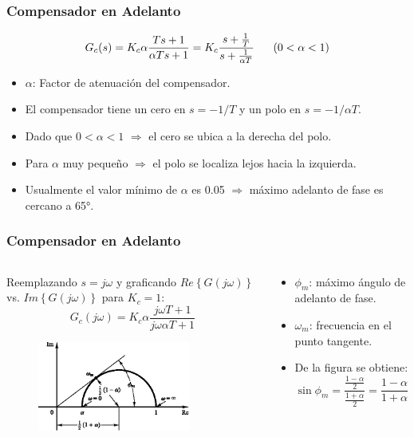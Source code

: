 \documentclass[aspectratio=169, handout]{beamer}
\theoremstyle{definition}
\theoremstyle{plain}
\theoremstyle{remark}
\begin{document}
\begin{frame}[<+->]\frametitle{Compensador en Adelanto}
	\begin{equation*}
		G_c(s) = K_c \alpha \frac{T s + 1}{\alpha T s + 1} = K_c \frac{s+\frac{1}{T}}{s + \frac{1}{\alpha T}}\hspace*{6mm} (0 < \alpha < 1)
	\end{equation*}
	\pause
	\begin{itemize}
		\item $\alpha$: Factor de atenuación del compensador.
		\item El compensador tiene un cero en $s = -1/T$ y un polo en $s = -1/\alpha T$.
		\item Dado que $0 < \alpha < 1$ $\Rightarrow$ el cero se ubica a la derecha del polo.
		\item Para $\alpha$ muy pequeño $\Rightarrow$ el polo se localiza lejos hacia la izquierda.
		\item Usualmente el valor mínimo de $\alpha$ es 0.05 $\Rightarrow$ máximo adelanto de fase es cercano a \ang{65}. 
	\end{itemize}
\end{frame}

\begin{frame}[<+->]\frametitle{Compensador en Adelanto}
\vspace*{3mm}
\begin{columns}
	\begin{column}{0.5\textwidth}
		Reemplazando $s=j\omega$ y graficando $Re\left\{G(j\omega)\right\}$ vs. $Im\left\{G(j\omega)\right\}$ para $K_c=1$:
		\begin{equation*}
			G_c(j\omega) = K_c \alpha \frac{j\omega T + 1}{j\omega \alpha T + 1}
		\end{equation*}
		\begin{figure}
			\centering 
			\includegraphics[width=5cm]{images/polarPlot.eps}
		\end{figure}
	\end{column}
	\begin{column}{0.5\textwidth}
		\begin{itemize}
			\item $\phi_m$: máximo ángulo de adelanto de fase.
			\item $\omega_m$: frecuencia en el punto tangente.
			\item De la figura se obtiene:
			\begin{equation*}
				\sin \phi_m = \frac{\frac{1-\alpha}{2}}{\frac{1+\alpha}{2}} = \frac{1-\alpha}{1+\alpha}
			\end{equation*}
		\end{itemize}
	\end{column}
\end{columns}
\end{frame}
\end{document}
